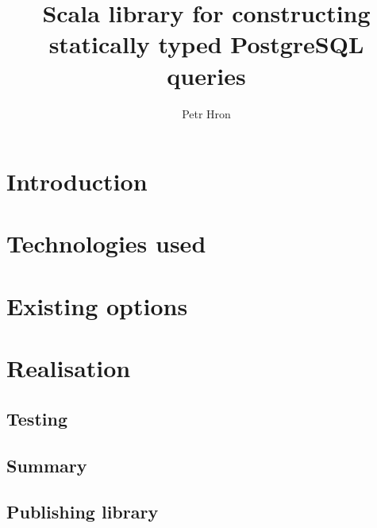 \documentclass[thesis=B,english]{FITthesis}[2019/12/23]
\title{Scala library for constructing statically typed PostgreSQL queries}
\author{Petr Hron} %
\begin{document}

\chapter{Introduction}



\chapter{Technologies used}





\chapter{Existing options}



\chapter{Realisation}















\section{Testing}
\section{Summary}

\section{Publishing library}
\end{document}
